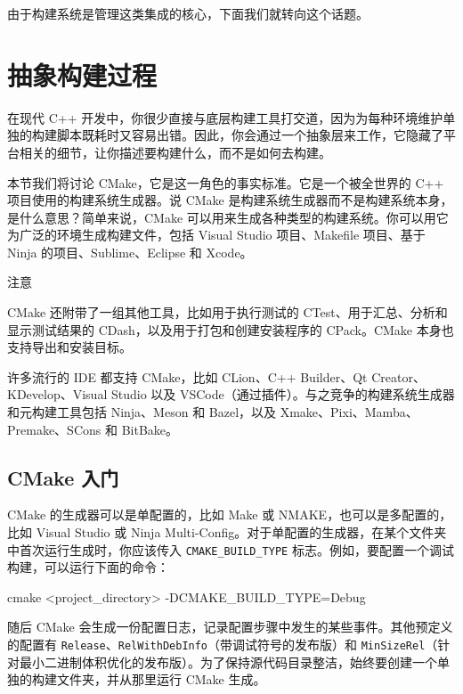 \label{idx:657}
由于构建系统是管理这类集成的核心，下面我们就转向这个话题。

\section{抽象构建过程}

\label{idx:658}
在现代 C++ 开发中，你很少直接与底层构建工具打交道，因为为每种环境维护单独的构建脚本既耗时又容易出错。因此，你会通过一个抽象层来工作，它隐藏了平台相关的细节，让你描述要构建什么，而不是如何去构建。

本节我们将讨论 CMake，它是这一角色的事实标准。它是一个被全世界的 C++ 项目使用的构建系统生成器。说 CMake 是构建系统生成器而不是构建系统本身，是什么意思？简单来说，CMake 可以用来生成各种类型的构建系统。你可以用它为广泛的环境生成构建文件，包括 Visual Studio 项目、Makefile 项目、基于 Ninja 的项目、Sublime、Eclipse 和 Xcode。

\begin{myNotic}{注意}

CMake 还附带了一组其他工具，比如用于执行测试的 CTest、用于汇总、分析和显示测试结果的 CDash，以及用于打包和创建安装程序的 CPack。CMake 本身也支持导出和安装目标。

许多流行的 IDE 都支持 CMake，比如 CLion、C++ Builder、Qt Creator、KDevelop、Visual Studio 以及 VSCode（通过插件）。与之竞争的构建系统生成器和元构建工具包括 Ninja、Meson 和 Bazel，以及 Xmake、Pixi、Mamba、Premake、SCons 和 BitBake。
\end{myNotic}

\subsection{CMake 入门}

\label{idx:659}
CMake 的生成器可以是单配置的，比如 Make 或 NMAKE，也可以是多配置的，比如 Visual Studio 或 Ninja Multi-Config。对于单配置的生成器，在某个文件夹中首次运行生成时，你应该传入 \texttt{CMAKE\_\allowbreak{}BUILD\_\allowbreak{}TYPE} 标志。例如，要配置一个调试构建，可以运行下面的命令：

\begin{codebox}[text]
cmake <project_directory> -DCMAKE_BUILD_TYPE=Debug
\end{codebox}

随后 CMake 会生成一份配置日志，记录配置步骤中发生的某些事件。其他预定义的配置有 \texttt{Release}、\texttt{Rel\allowbreak{}With\allowbreak{}Deb\allowbreak{}Info}（带调试符号的发布版）和 \texttt{Min\allowbreak{}Size\allowbreak{}Rel}（针对最小二进制体积优化的发布版）。为了保持源代码目录整洁，始终要创建一个单独的构建文件夹，并从那里运行 CMake 生成。

